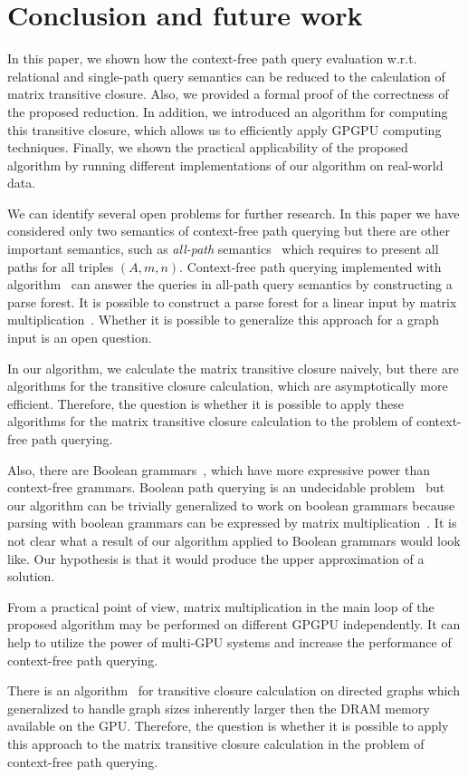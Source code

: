 \section{Conclusion and future work}
In this paper, we shown how the context-free path query evaluation w.r.t. relational and single-path query semantics can be reduced to the calculation of matrix transitive closure. Also, we provided a formal proof of the correctness of the proposed reduction. In addition, we introduced an algorithm for computing this transitive closure, which allows us to efficiently apply GPGPU computing techniques. Finally, we shown the practical applicability of the proposed algorithm by running different implementations of our algorithm on real-world data.

We can identify several open problems for further research. In this paper we have considered only two semantics of context-free path querying but there are other important semantics, such as \textit{all-path} semantics~\cite{hellingsPathQuerying} which requires to present all paths for all triples $(A,m,n)$. Context-free path querying implemented with algorithm~\cite{GLL} can answer the queries in all-path query semantics by constructing a parse forest. It is possible to construct a parse forest for a linear input by matrix multiplication~\cite{okhotin_cyk}. Whether it is possible to generalize this approach for a graph input is an open question.

In our algorithm, we calculate the matrix transitive closure naively, but there are algorithms for the transitive closure calculation, which are asymptotically more efficient. Therefore, the question is whether it is possible to apply these algorithms for the matrix transitive closure calculation to the problem of context-free path querying.

Also, there are Boolean grammars~\cite{okhotinBoolean}, which have more expressive power than context-free grammars. Boolean path querying is an undecidable problem~\cite{hellingsRelational} but our algorithm can be trivially generalized to work on boolean grammars because parsing with boolean grammars can be expressed by matrix multiplication~\cite{okhotin_cyk}. It is not clear what a result of our algorithm applied to Boolean grammars would look like. Our hypothesis is that it would produce the upper approximation of a solution.

From a practical point of view, matrix multiplication in the main loop of the proposed algorithm may be performed on different GPGPU independently. It can help to utilize the power of multi-GPU systems and increase the performance of context-free path querying.

There is an algorithm~\cite{apspGPU} for transitive closure calculation on directed graphs which generalized to handle graph sizes inherently larger then the DRAM memory available on the GPU. Therefore, the question is whether it is possible to apply this approach to the matrix transitive closure calculation in the problem of context-free path querying.